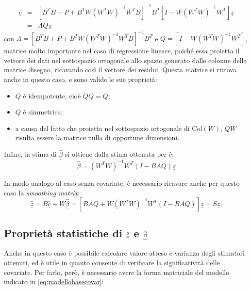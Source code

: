 \documentclass[a4paper,11pt,twoside,openright]{book}							%
\begin{document}
\begin{eqnarray}
 \label{eq:syscovar1}
\hat  {\underline c} &=& [B^TB+P+B^TW(W^TW)^{-1}W^TB]^{-1}B^T[I-W(W^TW)^{-1}W^T]\underline z  \nonumber \\
 &=& AQ \underline z
\end{eqnarray} 
con $A=[B^TB+P+B^TW(W^TW)^{-1}W^TB]^{-1}B^T$ e $Q=[I-W(W^TW)^{-1}W^T]$, matrice molto importante nel caso di regressione lineare, poiché essa proietta il vettore dei dati nel sottospazio ortogonale allo spazio generato dalle colonne della matrice disegno, ricavando così il vettore dei residui. Questa matrice si ritrova anche in questo caso, e sono valide le sue proprietà:
\begin{itemize}
\item $Q$ è idempotente, cioè $QQ=Q$;
\item $Q$ è simmetrica;
\item a causa del fatto che proietta nel sottospazio ortogonale di $\mathrm{Col}(W)$, $QW$ risulta essere la matrice nulla di opportune dimensioni. 
\end{itemize}

Infine, la stima di $\hat  {\underline \beta}$ si ottiene dalla stima ottenuta per $\hat  {\underline c}$:
\begin{equation}
\label{eq:syscovar2}
\hat{\underline{\beta}}=(W^TW)^{-1}W^T(I-B AQ)\underline z
\end{equation}

In modo analogo al caso senza covariate, è necessario ricavare anche per questo caso la \textit{smoothing matrix}:
$$
\hat  {\underline z} =B\hat  {\underline c} + W \hat  {\underline \beta} = [B AQ + W(W^TW)^{-1}W^T(I-B AQ)]\underline z = S\underline z .
$$

\subsection{Proprietà statistiche di $\hat  {\protect\underline{c}}$ e $\hat  {\protect\underline{\beta}}$}
\label{sec:IC}
Anche in questo caso è possibile calcolare valore atteso e varianza degli stimatori ottenuti, ed è utile in quanto consente di verificare la significatività delle covariate. Per farlo, però, è necessario avere la forma matriciale del modello indicato in \ref{eq:modellobasecovar}:
\end{document}

